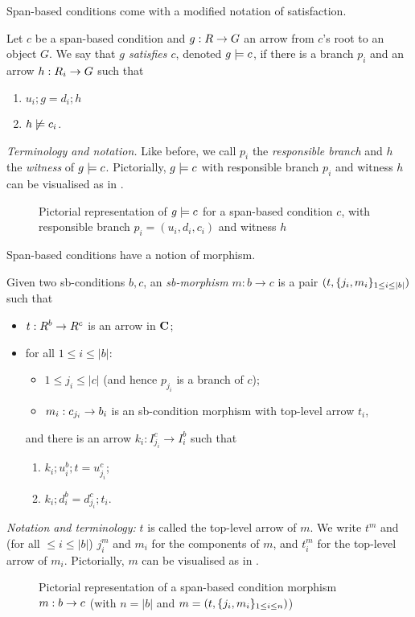 \medskip\noindent Span-based conditions come with a modified notation of satisfaction.

\begin{definition}
  Let $c$ be a span-based condition and $g:R\rightarrow G$ an arrow from $c$'s root to an object $G$. We say that \emph{$g$ satisfies $c$}, denoted $g\models c$, if there is a branch $p_i$ and an arrow $h:R_i\rightarrow G$ such that
  \begin{enumerate}
  \item $u_i;g=d_i;h$
  \item $h\not\models c_i$.
  \end{enumerate}
\end{definition}
%
\emph{Terminology and notation.} Like before, we call $p_i$ the \emph{responsible branch} and $h$ the \emph{witness} of $g\models c$. Pictorially, $g\models c$ with responsible branch $p_i$ and witness $h$ can be visualised as in .
%
\begin{figure}
  \centering
  
  \caption{Pictorial representation of $g\models c$ for a span-based condition $c$, with responsible branch $p_i=(u_i,d_i,c_i)$ and witness $h$}
\end{figure}

\medskip\noindent
Span-based conditions have a notion of morphism.

\begin{definition}
  Given two sb-conditions $b,c$, an \emph{sb-morphism} $m:b\to c$ is a pair $(t,\{{j_i,m_i}\}_{1\leq i\leq|b|})$ such that
  \begin{itemize}
  \item $t:R^b\rightarrow R^c$ is an arrow in $\mathbf{C}$;  
  \item for all $1\leq i\leq |b|$:
    \begin{itemize}
    \item $1\leq j_i\leq |c|$ (and hence $p_{j_i}$ is a branch of $c$);
    \item $m_i:c_{j_i}\rightarrow b_i$ is an sb-condition morphism with top-level arrow $t_i$,
    \end{itemize}
    and there is an arrow $k_i:I^c_{j_i}\to I^b_i$ such that
    \begin{enumerate}
    \item $k_i;u^b_i;t=u^c_{j_i}$;
    \item $k_i;d^b_i=d^c_{j_i};t_i$.
    \end{enumerate}
  \end{itemize}
\end{definition}
%
\emph{Notation and terminology:} $t$ is called the top-level arrow of $m$. We write $t^m$ and (for all $\leq i\leq |b|$) $j^m_i$ and $m_i$ for the components of $m$, and $t^m_i$ for the top-level arrow of $m_i$. Pictorially, $m$ can be visualised as in .
%
\begin{figure}
  \centering
  
  \caption{Pictorial representation of a span-based condition morphism $m:b\rightarrow c$ (with $n=|b|$ and $m=(t,\{{j_i,m_i}\}_{1\leq i\leq n})$)}
\end{figure}

